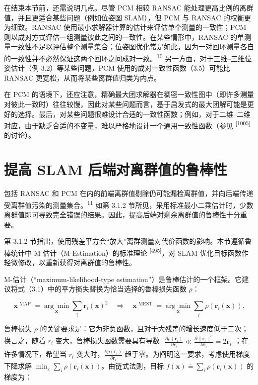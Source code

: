 在结束本节前，还需说明几点。尽管 PCM 相较 RANSAC 能处理更高比例的离群值，并且更适合某些问题（例如位姿图 SLAM），但 PCM 与 RANSAC 的权衡更为细致。RANSAC 使用最小求解器计算的估计来评估单个测量的一致性；PCM 则以成对方式评估一组测量彼此之间的一致性。在某些情形中，RANSAC 的单测量一致性不足以评估整个测量集合；位姿图优化常是如此，因为一对回环测量各自的一致性并不必然保证这两个回环之间成对一致。\textsuperscript{10} 另一方面，对于三维–三维位姿估计（例 3.2）等某些问题，PCM 使用的成对一致性函数（3.5）可能比 RANSAC 更宽松，从而将某些离群值归类为内点。

在 PCM 的语境下，还应注意，精确最大团求解器在稠密一致性图中（即许多测量对彼此一致时）往往较慢，因此对某些问题而言，基于启发式的最大团解可能是更好的选择。最后，对某些问题很难设计合适的一致性函数；例如，对于二维–二维对应，由于缺乏合适的不变量，难以严格地设计一个通用一致性函数（参见 \textsuperscript{[1005]} 的讨论）。

\section{提高 SLAM 后端对离群值的鲁棒性}

包括 RANSAC 和 PCM 在内的前端离群值剔除仍可能漏检离群值，并向后端传递受离群值污染的测量集合。\textsuperscript{11} 如第 3.1.2 节所见，采用标准最小二乘估计时，少数离群值即可导致完全错误的结果。因此，提高后端对剩余离群值的鲁棒性十分重要。

第 3.1.2 节指出，使用残差平方会“放大”离群测量对代价函数的影响。本节遵循鲁棒统计中 M-估计（M-Estimation）的标准理论 \textsuperscript{[495]}，对 SLAM 优化目标函数作轻微修改，以重新获得对离群值的鲁棒性。

M-估计（“maximum-likelihood-type estimation”）是鲁棒估计的一个框架。它建议将式（3.1）中的平方损失替换为恰当选择的鲁棒损失函数 $\rho$：

\begin{equation}
\boldsymbol {x} ^ {\text { MAP }} = \underset {\boldsymbol {x}} {\arg \min} \sum_ {i} \boldsymbol {r} _ {i} (\boldsymbol {x}) ^ {2} \quad \Longrightarrow \quad \boldsymbol {x} ^ {\text { MEST }} = \underset {\boldsymbol {x}} {\arg \min} \sum_ {i} \rho \left(\boldsymbol {r} _ {i} (\boldsymbol {x})\right).\tag{3.9}
\end{equation}

鲁棒损失 $\rho$ 的关键要求是：它为非负函数，且对于大残差的增长速度低于二次；换言之，随着 $r _ { i }$ 变大，鲁棒损失函数需要具有导数 $\begin{array} { r } { \frac { \partial \rho ( \pmb { r } _ { i } ) } { \partial \pmb { r } _ { i } } \ll \frac { \partial \| \pmb { r } _ { i } \| ^ { 2 } } { \partial \pmb { r } _ { i } } = 2 \pmb { r } _ { i } } \end{array}$；在许多情况下，希望当 $r _ { i }$ 变大时，$\frac { \partial \rho ( \pmb { r } _ { i } ) } { \partial \pmb { r } _ { i } }$ 趋于零。为阐明这一要求，考虑使用梯度下降求解 $\min _ { \mathbf { \mathcal { x } } } \sum _ { i } \rho \left( \pmb { r } _ { i } ( \pmb { x } ) \right)$。由链式法则，目标 $f ( \pmb { x } ) \doteq \sum _ { i } \rho \left( \pmb { r } _ { i } ( \pmb { x } ) \right)$ 的梯度为：

